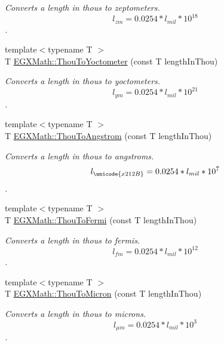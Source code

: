 \begin{DoxyCompactItemize}
\begin{DoxyCompactList}\small\item\em Converts a length in thous to zeptometers. \[ l_{zm}=0.0254 * l_{mil} * 10^{18} \]. \end{DoxyCompactList}\item 
{\footnotesize template$<$typename T $>$ }\\T \mbox{\hyperlink{group___e_g_x_math-_conversions-_length_conversions-_imperial-_thou-_s_i_ga9d6f9fc2ae199f7d67e0eff86cc17caf}{E\+G\+X\+Math\+::\+Thou\+To\+Yoctometer}} (const T length\+In\+Thou)
\begin{DoxyCompactList}\small\item\em Converts a length in thous to yoctometers. \[ l_{ym}=0.0254 * l_{mil} * 10^{21} \]. \end{DoxyCompactList}\item 
{\footnotesize template$<$typename T $>$ }\\T \mbox{\hyperlink{group___e_g_x_math-_conversions-_length_conversions-_imperial-_thou-_non-_s_i_ga5d852bdec8556e4b6bde1445f5f74a20}{E\+G\+X\+Math\+::\+Thou\+To\+Angstrom}} (const T length\+In\+Thou)
\begin{DoxyCompactList}\small\item\em Converts a length in thous to angstroms. \[ l_{\unicode{x212B}}=0.0254 * l_{mil} * 10^{7} \]. \end{DoxyCompactList}\item 
{\footnotesize template$<$typename T $>$ }\\T \mbox{\hyperlink{group___e_g_x_math-_conversions-_length_conversions-_imperial-_thou-_non-_s_i_ga4a134cf9b956cd51e579dc65b4fd7774}{E\+G\+X\+Math\+::\+Thou\+To\+Fermi}} (const T length\+In\+Thou)
\begin{DoxyCompactList}\small\item\em Converts a length in thous to fermis. \[ l_{fm}=0.0254 * l_{mil} * 10^{12} \]. \end{DoxyCompactList}\item 
{\footnotesize template$<$typename T $>$ }\\T \mbox{\hyperlink{group___e_g_x_math-_conversions-_length_conversions-_imperial-_thou-_non-_s_i_ga7f43c9a1cbb845911bdcbbbe388347a1}{E\+G\+X\+Math\+::\+Thou\+To\+Micron}} (const T length\+In\+Thou)
\begin{DoxyCompactList}\small\item\em Converts a length in thous to microns. \[ l_{\mu m}=0.0254 * l_{mil} * 10^{3} \]. \end{DoxyCompactList}\item 

\end{DoxyCompactItemize}
